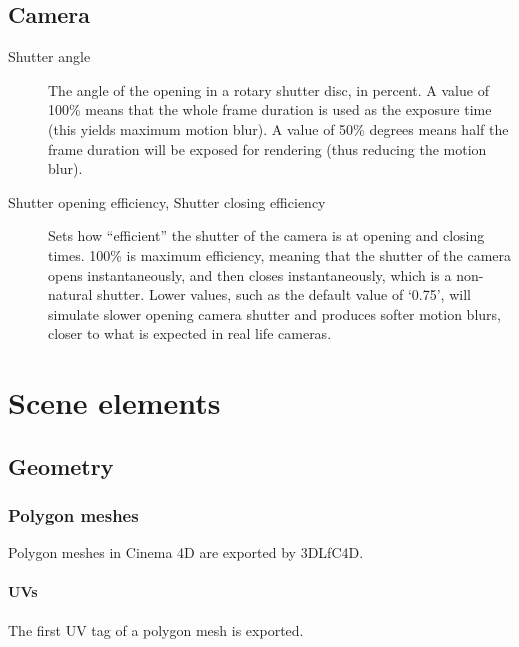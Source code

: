 \documentclass{book}
\begin{document}
\section{Camera}
\begin{description}
\item[Shutter angle] The angle of the opening in a rotary shutter disc, in percent. A value of 100\% means that the whole frame duration is used as the exposure time (this yields maximum motion blur). A value of 50\% degrees means half the frame duration will be exposed for rendering (thus reducing the motion blur).


\item[Shutter opening efficiency, Shutter closing efficiency] Sets how “efficient” the shutter of the camera is at opening and closing times. 100\% is maximum efficiency, meaning that the shutter of the camera opens instantaneously, and then closes instantaneously, which is a non-natural shutter. Lower values, such as the default value of ‘0.75’, will simulate slower opening camera shutter and produces softer motion blurs, closer to what is expected in real life cameras.

\end{description}

\chapter{Scene elements}
\section{Geometry}

\subsection{Polygon meshes}
Polygon meshes in Cinema 4D are exported by 3DLfC4D. 

\subsubsection{UVs}
The first UV tag of a polygon mesh is exported. 
\end{document}
